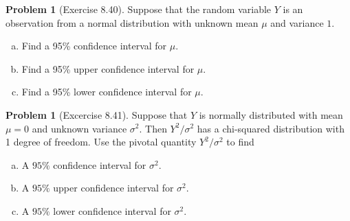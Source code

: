 \documentclass[10pt]{article}
\theoremstyle{definition}
\newtheorem{problem}[theorem]{Problem}
\newcommand{\1}[1]{\textbf{1}_{\left[#1\right]}} %
\begin{document}
\begin{problem}[Exercise 8.40]
  Suppose that the random variable $Y$ is an observation from a normal
  distribution with unknown mean $\mu$ and variance $1$.
  \begin{enumerate}[(a)]
    \item Find a 95\% confidence interval for $\mu$. 
    \item Find a 95\% upper confidence interval for $\mu$. 
    \item Find a 95\% lower confidence interval for $\mu$. 
  \end{enumerate}
\end{problem}

\begin{problem}[Excercise 8.41]
  Suppose that $Y$ is normally distributed with mean $\mu=0$ and unknown
  variance $\sigma^{2}$. Then $Y^{2}/\sigma^{2}$ has a chi-squared
  distribution with 1 degree of freedom. Use the pivotal quantity
  $Y^{2}/\sigma^{2}$ to find
  \begin{enumerate}[(a)]
    \item A $95\%$ confidence interval for $\sigma^{2}$.
    \item A $95\%$ upper confidence interval for $\sigma^{2}$.
    \item A $95\%$ lower confidence interval for $\sigma^{2}$.
  \end{enumerate}
\end{problem}
\end{document}
